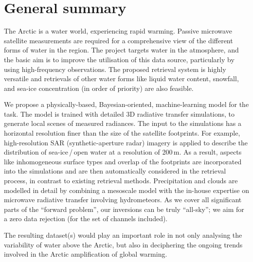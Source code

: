 \documentclass[12pt,oneside,a4paper]{article}
\begin{document}
	
	
	\thispagestyle{empty}
	\vspace*{-10mm}
	\noindent
	\textbf{\Large \LongTitle}




\section{General summary}
%
The Arctic is a water world, experiencing rapid warming. Passive microwave
satellite measurements are required for a comprehensive view of the different forms of water in the region. The project targets water in the atmosphere, and the basic aim is to improve the utilisation of this data source, particularly by using high-frequency observations. The proposed retrieval system is highly versatile and retrievals of other water forms like liquid water content, snowfall, and sea-ice concentration (in order of priority) are also feasible.

We propose a physically-based, Bayesian-oriented, machine-learning model for
the task. The model is trained with detailed 3D radiative transfer simulations,
to generate local scenes of measured radiances. The input to the simulations
has a horizontal resolution finer than the size of the satellite footprints.
For example, high-resolution SAR (synthetic-aperture radar) imagery is applied
to describe the distribution of sea-ice\,/\,open water at a resolution of
200\,m. As a result, aspects like inhomogeneous surface types and overlap of
the footprints are incorporated into the simulations and are then automatically
considered in the retrieval process, in contrast to existing retrieval methods.
Precipitation and clouds are modelled in detail by combining a mesoscale model
with the in-house expertise on microwave radiative transfer involving
hydrometeors. As we cover all significant parts of the ``forward problem'', our
inversions can be truly ``all-sky''; we aim for a zero data rejection (for the
set of channels included).

The resulting dataset(s) would play an important role in not only analysing the
variability of water above the Arctic, but also in deciphering the
ongoing trends involved in the Arctic amplification of global warming.
\end{document}
